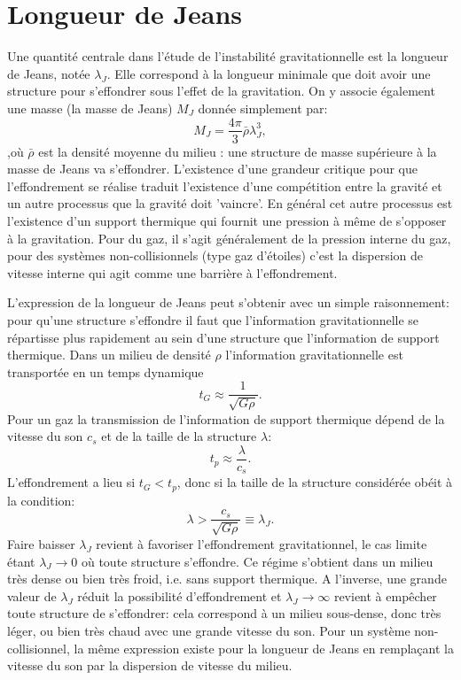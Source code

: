 \section{Longueur de Jeans}
Une quantité centrale dans l'étude de l'instabilité gravitationnelle est la longueur de Jeans, notée $\lambda_J$. Elle correspond à la longueur minimale  que doit avoir une structure pour s'effondrer sous l'effet de la gravitation. On y associe également une masse (la masse de Jeans) $M_J$ donnée simplement par:
\begin{equation}
M_J=\frac{4\pi}{3}\bar\rho\lambda_J^3,
\end{equation}
,où $\bar \rho$ est la densité moyenne du milieu : une structure de masse supérieure à la masse de Jeans va s'effondrer. L'existence d'une grandeur critique pour que l'effondrement se réalise traduit l'existence d'une compétition entre la gravité et un autre processus que la gravité doit 'vaincre'. En général cet autre processus est l'existence d'un support thermique qui fournit une pression à même de s'opposer à la gravitation. Pour du gaz, il s'agit généralement de la pression interne du gaz, pour des systèmes non-collisionnels (type gaz d'étoiles) c'est la dispersion de vitesse interne qui agit comme une barrière à l'effondrement.

L'expression de la longueur de Jeans peut s'obtenir avec un simple raisonnement: pour qu'une structure s'effondre il faut que l'information gravitationnelle se répartisse plus rapidement au sein d'une structure que l'information de support thermique. Dans un milieu de densité $\rho$ l'information gravitationnelle est transportée en un temps dynamique
\begin{equation}
t_G\approx \frac{1}{\sqrt{G\rho}}.
\end{equation}
Pour un gaz la transmission de l'information de support thermique dépend de la vitesse du son $c_s$ et de la taille de la structure $\lambda$:
\begin{equation}
t_p\approx\frac{\lambda}{c_s}.
\end{equation}
L'effondrement a lieu si $t_G<t_p$, donc si la taille de la structure considérée obéit à la condition:
\begin{equation}
\lambda >\frac{c_s}{\sqrt{G\rho}}\equiv \lambda_J.
\end{equation}
Faire baisser $\lambda_J$ revient à favoriser l'effondrement gravitationnel, le cas limite étant $\lambda_J \rightarrow 0$ où toute structure s'effondre. Ce régime s'obtient dans un milieu très dense ou bien très froid, i.e. sans support thermique.  A l'inverse, une grande valeur de $\lambda_J$ réduit la possibilité d'effondrement et $\lambda_J\rightarrow\infty$ revient à empêcher toute structure de s'effondrer: cela correspond à un milieu sous-dense, donc très léger, ou bien très chaud avec une grande vitesse du son. Pour un système non-collisionnel, la même expression existe pour la longueur de Jeans en remplaçant la vitesse du son par la dispersion de vitesse du milieu.

